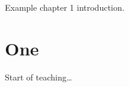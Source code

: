 \documentclass[book]{subfiles}
\begin{document}
\makefrontpages
\introduction
Example chapter 1 introduction.
\section{One}
Start of teaching\ldots
\printexercisesolutions
\printindex
\end{document}
